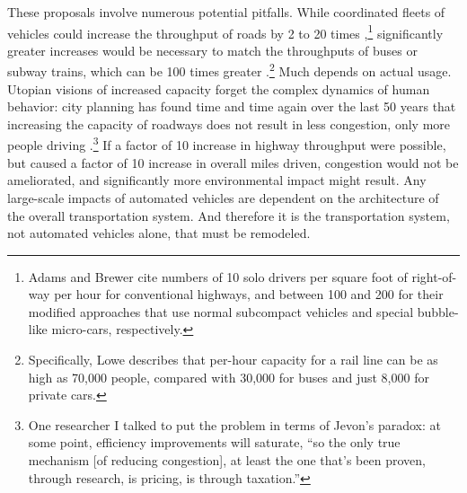 These proposals involve numerous potential pitfalls. While coordinated
fleets of vehicles could increase the throughput of roads by 2 to 20
times \cite[p. 229]{adamsBrewerRoadways},\footnote{Adams and Brewer
  cite numbers of 10 solo drivers per square foot of right-of-way per
  hour for conventional highways, and between 100 and 200 for their
  modified approaches that use normal subcompact vehicles and special
  bubble-like micro-cars, respectively.} significantly greater
increases would be necessary to match the 
throughputs of buses or subway trains, which can be 100 times
greater \cite[p. 222]{loweCars}.\footnote{Specifically, Lowe describes that
  per-hour capacity for 
  a rail line can be as high as 70,000 people, compared with 30,000 for buses
and just 8,000 for private cars.} Much depends on actual usage.
Utopian visions of increased capacity forget the complex dynamics of
human behavior: city planning has found 
time and time again over the last 50 years that increasing the
capacity of roadways does not result in less congestion, only more
people driving \cite[p. 219]{marshallFuture}.\footnote{One researcher I talked
to put the problem in terms of Jevon's paradox: at some point,
efficiency improvements will saturate, ``so the only true mechanism
[of reducing congestion],
at least the one that's been proven, through research, is pricing, is
through taxation.''} If a factor of 10
increase in highway throughput were possible, but caused a factor of
10 increase in overall miles driven, congestion would not be
ameliorated, and significantly more environmental impact might result. Any
large-scale impacts of automated vehicles are dependent on the
architecture of the overall transportation system. And therefore it is
the transportation system, not automated vehicles alone, that must be remodeled.




